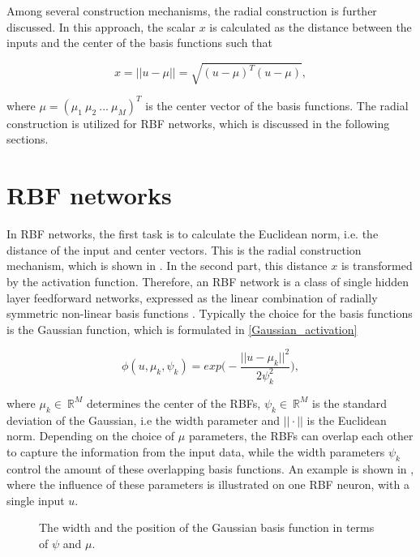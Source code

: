 Among several construction mechanisms, the radial construction is further discussed. In this approach, the scalar $x$ is calculated as the distance between the inputs and the center of the basis functions such that 

 \begin{equation}
\label{radial_structure}
x = ||u- \mu|| = \sqrt{(u-\mu)^T (u-\mu)},
\end{equation}

where $\mu = (\mu_1 \ \mu_2 \ ... \ \mu_M)^T$ is the center vector of the basis functions. The radial construction is utilized for RBF networks, which is discussed in the following sections.


\section{RBF networks}
\label{Radial_basis_function_networks}

 In RBF networks, the first task is to calculate the Euclidean norm, i.e. the distance of the input and center vectors. This is the radial construction mechanism, which is shown in . In the second part, this distance $x$ is transformed by the activation function. Therefore, an RBF network is a class of single hidden layer feedforward networks, expressed as the linear combination of radially symmetric non-linear basis functions \cite{RBF_article}. Typically the choice for the basis functions is the Gaussian function, which is formulated in \eqref{Gaussian_activation} 

\begin{equation}
\label{Gaussian_activation}
\phi(u,\mu_k, \psi_k) = exp \Big(-\frac{||u-\mu_k||^2}{2\psi_k^2}\Big), 
\end{equation}

where $\mu_k \in \: \mathbb{R}^{M}$ determines the center of the RBFs, $\psi_k \in \: \mathbb{R}^{M}$ is the standard deviation of the Gaussian, i.e the width parameter and $||\cdot||$ is the Euclidean norm. Depending on the choice of $\mu$ parameters, the RBFs can overlap each other to capture the information from the input data, while the width parameters $\psi_k$ control the amount of these overlapping basis functions. An example is shown in , where the influence of these parameters is illustrated on one RBF neuron, with a single input $u$. 

\begin{figure}[H]
\centering
 
\caption{The width and the position of the Gaussian basis function in terms of $\psi$ and $\mu$.}
\label{fig:rbf_pram}
\end{figure}

